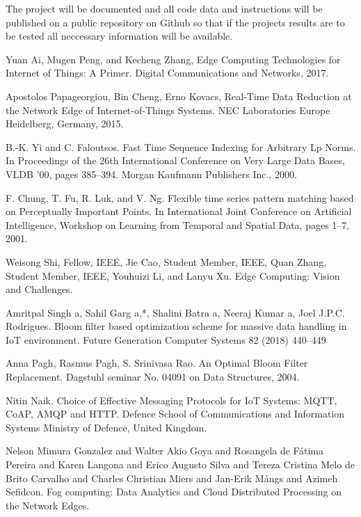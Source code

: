 \documentclass[11pt,journal, a4paper]{IEEEtran}
\begin{document}
  

\noindent
The project will be documented and all code data and instructions will be published on a public repository on Github so that if the projects results are to be tested all neccessary information will be available. 



\begin{thebibliography}{11}


 Yuan Ai, Mugen Peng, and Kecheng Zhang, Edge Computing Technologies for Internet of Things: A Primer. Digital Communications and Networks, 2017.




 Apostolos Papageorgiou, Bin Cheng, Erno Kovacs, Real-Time Data Reduction at the Network Edge of Internet-of-Things Systems. NEC Laboratories Europe Heidelberg, Germany, 2015.

B.-K. Yi and C. Faloutsos. Fast Time Sequence Indexing for Arbitrary
Lp Norms. In Proceedings of the 26th International Conference on
Very Large Data Bases, VLDB ’00, pages 385–394. Morgan Kaufmann
Publishers Inc., 2000.

F. Chung, T. Fu, R. Luk, and V. Ng. Flexible time series pattern
matching based on Perceptually Important Points. In International
Joint Conference on Artificial Intelligence, Workshop on Learning from
Temporal and Spatial Data, pages 1–7, 2001.

Weisong Shi, Fellow, IEEE, Jie Cao, Student Member, IEEE, Quan Zhang, Student Member, IEEE, Youhuizi Li, and Lanyu Xu. Edge Computing: Vision and Challenges. 


Amritpal Singh a, Sahil Garg a,*, Shalini Batra a, Neeraj Kumar a, Joel J.P.C. Rodrigues. Bloom filter based optimization scheme for massive data handling in IoT environment. Future Generation Computer Systems 82 (2018) 440–449



Anna Pagh, Rasmus Pagh, S. Srinivasa Rao. An Optimal Bloom Filter Replacement. Dagstuhl seminar No. 04091 on Data Structures, 2004.

Nitin Naik.
Choice of Effective Messaging Protocols for IoT Systems: MQTT, CoAP, AMQP and HTTP.
Defence School of Communications and Information Systems Ministry of Defence, United Kingdom.


Nelson Mimura Gonzalez and Walter Akio Goya and Rosangela de Fátima Pereira and Karen Langona and
Erico Augusto Silva and Tereza Cristina Melo de Brito Carvalho and Charles Christian Miers and Jan-Erik Mångs and Azimeh Sefidcon. Fog computing: Data Analytics and Cloud Distributed Processing on the Network Edges. 


\end{thebibliography}
\end{document}
